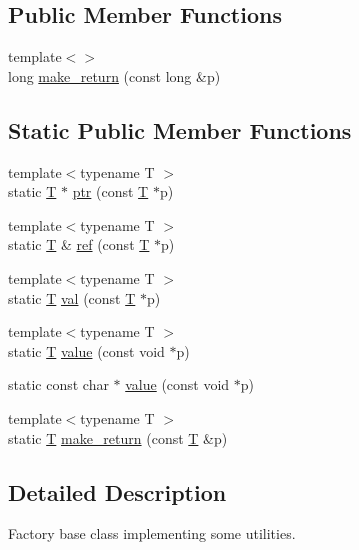 \subsection*{Public Member Functions}
\begin{DoxyCompactItemize}
\item 
{\footnotesize template$<$$>$ }\\long \hyperlink{struct_d_d4hep_1_1_plugin_factory_base_a75390f6289dd15b8dee266cd6ae542d5}{make\_\-return} (const long \&p)
\end{DoxyCompactItemize}
\subsection*{Static Public Member Functions}
\begin{DoxyCompactItemize}
\item 
{\footnotesize template$<$typename T $>$ }\\static \hyperlink{class_t}{T} $\ast$ \hyperlink{struct_d_d4hep_1_1_plugin_factory_base_aa33c408b5e8b5958dd374b9df33ccf18}{ptr} (const \hyperlink{class_t}{T} $\ast$p)
\item 
{\footnotesize template$<$typename T $>$ }\\static \hyperlink{class_t}{T} \& \hyperlink{struct_d_d4hep_1_1_plugin_factory_base_a3bdd1fb899c61e38fcf8c64e4f5b7578}{ref} (const \hyperlink{class_t}{T} $\ast$p)
\item 
{\footnotesize template$<$typename T $>$ }\\static \hyperlink{class_t}{T} \hyperlink{struct_d_d4hep_1_1_plugin_factory_base_a261416ecf4b5243bd84bb429401f6255}{val} (const \hyperlink{class_t}{T} $\ast$p)
\item 
{\footnotesize template$<$typename T $>$ }\\static \hyperlink{class_t}{T} \hyperlink{struct_d_d4hep_1_1_plugin_factory_base_a3b1b68f3c9ddfbb98372fd89f852f372}{value} (const void $\ast$p)
\item 
static const char $\ast$ \hyperlink{struct_d_d4hep_1_1_plugin_factory_base_a8adc43989827d1bc0a6d079b3e64f756}{value} (const void $\ast$p)
\item 
{\footnotesize template$<$typename T $>$ }\\static \hyperlink{class_t}{T} \hyperlink{struct_d_d4hep_1_1_plugin_factory_base_aa44571c9839b48465479b00174edff61}{make\_\-return} (const \hyperlink{class_t}{T} \&p)
\end{DoxyCompactItemize}


\subsection{Detailed Description}
Factory base class implementing some utilities. 

